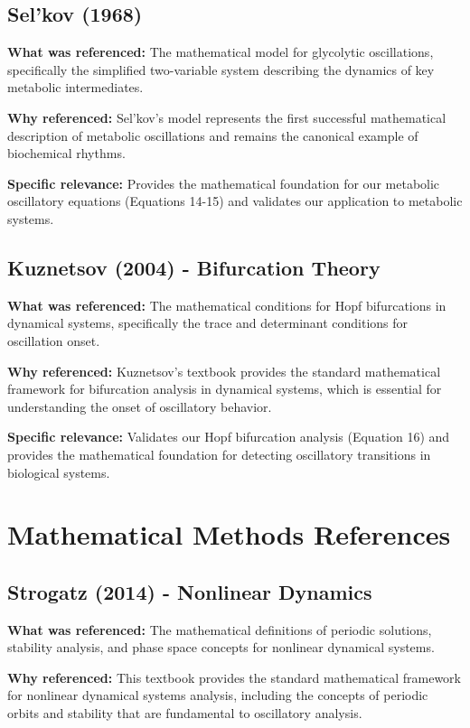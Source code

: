 \documentclass{article}
\begin{document}
\subsection{Sel'kov (1968)}

\textbf{What was referenced:} The mathematical model for glycolytic oscillations, specifically the simplified two-variable system describing the dynamics of key metabolic intermediates.

\textbf{Why referenced:} Sel'kov's model represents the first successful mathematical description of metabolic oscillations and remains the canonical example of biochemical rhythms.

\textbf{Specific relevance:} Provides the mathematical foundation for our metabolic oscillatory equations (Equations 14-15) and validates our application to metabolic systems.

\subsection{Kuznetsov (2004) - Bifurcation Theory}

\textbf{What was referenced:} The mathematical conditions for Hopf bifurcations in dynamical systems, specifically the trace and determinant conditions for oscillation onset.

\textbf{Why referenced:} Kuznetsov's textbook provides the standard mathematical framework for bifurcation analysis in dynamical systems, which is essential for understanding the onset of oscillatory behavior.

\textbf{Specific relevance:} Validates our Hopf bifurcation analysis (Equation 16) and provides the mathematical foundation for detecting oscillatory transitions in biological systems.

\section{Mathematical Methods References}

\subsection{Strogatz (2014) - Nonlinear Dynamics}

\textbf{What was referenced:} The mathematical definitions of periodic solutions, stability analysis, and phase space concepts for nonlinear dynamical systems.

\textbf{Why referenced:} This textbook provides the standard mathematical framework for nonlinear dynamical systems analysis, including the concepts of periodic orbits and stability that are fundamental to oscillatory analysis.
\end{document}

